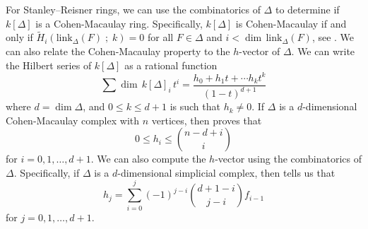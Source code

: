 \documentclass[12pt,leqno]{amsart}
\theoremstyle{definition}
\begin{document}

For Stanley--Reisner rings, we can use the combinatorics of $\Delta$ to determine if $k[\Delta]$ is a Cohen-Macaulay ring. Specifically, $k[\Delta]$ is Cohen-Macaulay if and only if $\widetilde H_i(\mathrm{link}_\Delta(F)\; ;\;k) = 0$ for all $F \in \Delta$ and $i < \dim \hspace{2pt} \mathrm{link}_\Delta(F)$, see \cite[Corollary 5.3.9]{BH}. We can also relate the Cohen-Macaulay property to the $h$-vector of $\Delta$. We can write the Hilbert series of $k[\Delta]$ as a rational function
%
\begin{displaymath}
  \sum \dim \hspace{2pt} k[\Delta]_i \hspace{2pt} t^i = \frac {h_0 + h_1t + \cdots h_k t^k}{(1-t)^{d+1}}
\end{displaymath}
%
where $d = \dim \Delta$, and $0 \leq k \leq d+1$ is such that $h_k \not = 0$. If $\Delta$ is a $d$-dimensional Cohen-Macaulay complex with $n$ vertices, then \cite[Lemma 5.1.10]{BH} proves that
%
\begin{displaymath}
  0 \leq h_i \leq \binom{n-d+i}{i}
\end{displaymath}
%
for $i = 0,1,\dotsc,d+1$. We can also compute the $h$-vector using the combinatorics of $\Delta$. Specifically, if $\Delta$ is a $d$-dimensional simplicial complex, then \cite[Lemma 5.1.8]{BH} tells us that
%
\begin{displaymath}
  h_j = \sum_{i=0}^j (-1)^{j-i} \binom{d+1-i}{j-i}f_{i-1}
\end{displaymath}
%
for $j = 0,1,\dotsc,d+1$.
%
\end{document}
